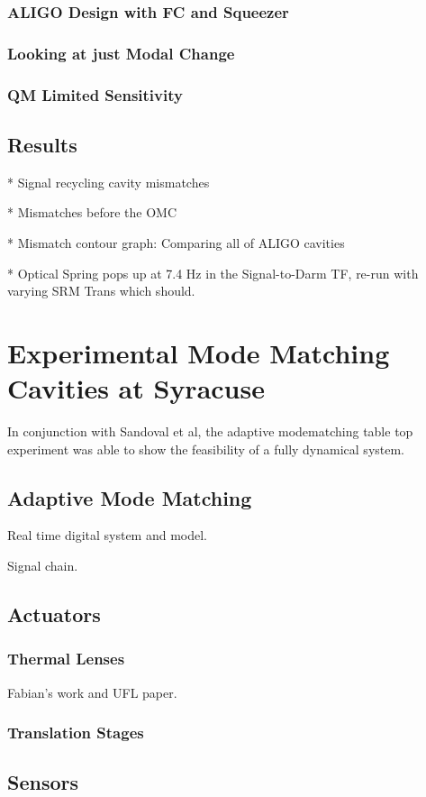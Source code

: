 \documentclass[oneside]{book}
\begin{document}
		\subsection{ALIGO Design with FC and Squeezer}
		\subsection{Looking at just Modal Change}
		\subsection{QM Limited Sensitivity}
			
	\section{Results}
		* Signal recycling cavity mismatches

		* Mismatches before the OMC
			
		* Mismatch contour graph: Comparing all of ALIGO cavities
		
		* Optical Spring pops up at 7.4 Hz in the Signal-to-Darm TF, re-run with varying SRM Trans which should.

\chapter{Experimental Mode Matching Cavities at Syracuse}
In conjunction with Sandoval et al, the adaptive modematching table top experiment was able to show the feasibility of a fully dynamical system.
	\section{Adaptive Mode Matching}
	Real time digital system and model.
	
	Signal chain.
	
	\section{Actuators}
		\subsection{Thermal Lenses}
		Fabian's work and UFL paper.
		\subsection{Translation Stages}
		
	\section{Sensors}
\end{document}
